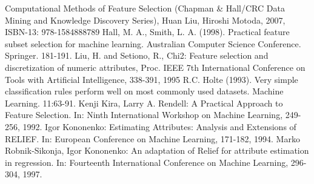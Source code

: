 \documentclass[10pt]{article}\usepackage[]{graphicx}\usepackage[]{color}
\begin{document}
\clearpage
\begin{thebibliography}{99}
\bibitem{} Computational Methods of Feature Selection (Chapman \& Hall/CRC Data Mining and Knowledge Discovery Series), Huan Liu, Hiroshi Motoda, 2007, ISBN-13: 978-1584888789  
\bibitem{} Hall, M. A., Smith, L. A. (1998). Practical feature subset selection for machine learning. Australian Computer Science Conference. Springer. 181-191.
\bibitem{} Liu, H. and Setiono, R., Chi2: Feature selection and discretization of numeric attributes, Proc. IEEE 7th International Conference on Tools with Artificial Intelligence, 338-391, 1995
\bibitem{} R.C. Holte (1993). Very simple classification rules perform well on most commonly used datasets. Machine Learning. 11:63-91.
\bibitem{} Kenji Kira, Larry A. Rendell: A Practical Approach to Feature Selection. In: Ninth International Workshop on Machine Learning, 249-256, 1992.
\bibitem{} Igor Kononenko: Estimating Attributes: Analysis and Extensions of RELIEF. In: European Conference on Machine Learning, 171-182, 1994.
\bibitem{} Marko Robnik-Sikonja, Igor Kononenko: An adaptation of Relief for attribute estimation in regression. In: Fourteenth International Conference on Machine Learning, 296-304, 1997.
\end{thebibliography}
\end{document}
